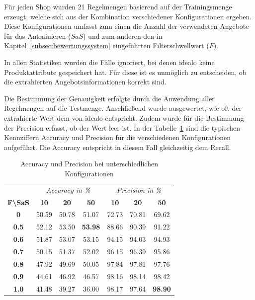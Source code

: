 Für jeden Shop wurden 21 Regelmengen basierend auf der Trainingsmenge erzeugt, welche sich aus der Kombination
verschiedener Konfigurationen ergeben.
Diese Konfigurationen umfasst zum einen die Anzahl der verwendeten Angebote für das Antrainieren ($SaS$) und zum
anderen den in Kapitel~\ref{subsec:bewertungssystem} eingeführten Filterschwellwert ($F$).

In allen Statistiken wurden die Fälle ignoriert, bei denen idealo keine Produktattribute gespeichert hat.
Für diese ist es unmöglich zu entscheiden, ob die extrahierten Angebotsinformationen korrekt sind.

Die Bestimmung der Genauigkeit erfolgte durch die Anwendung aller Regelmengen auf die Testmenge.
Anschließend wurde ausgewertet, wie oft der extrahierte Wert dem von idealo entspricht.
Zudem wurde für die Bestimmung der Precision erfasst, ob der Wert leer ist.
In der Tabelle~\ref{tab:accuracy-precision} sind die typischen Kennziffern Accuracy und Precision für die
verschiedenen Konfigurationen aufgeführt.
Die Accuracy entspricht in diesem Fall gleichzeitig dem Recall.

\begin{table}[h]
    \centering
    \begin{tabular}{ c | c c c | c c c }
        &   \multicolumn{3}{c}{\textit{Accuracy in \%}}    &   \multicolumn{3}{c}{\textit{Precision in \%}} \\
        \textbf{F\textbackslash SaS} & \textbf{10} & \textbf{20} & \textbf{50} & \textbf{10} & \textbf{20} & \textbf{50}  \\
        \hline
        \textbf{0}       &   50.59 &   50.78 &   51.07         &   72.73 &   70.81 &   69.62 \\
        \textbf{0.5}     &   52.12 &   53.50 &   \textbf{53.98}&   88.66 &   90.39 &   91.22 \\
        \textbf{0.6}     &   51.87 &   53.07 &   53.15         &   94.15 &   94.03 &   94.93 \\
        \textbf{0.7}     &   50.15 &   51.37 &   52.02         &   96.15 &   96.39 &   95.86 \\
        \textbf{0.8}     &   47.92 &   49.69 &   50.05         &   97.84 &   97.81 &   97.76 \\
        \textbf{0.9}     &   44.61 &   46.92 &   46.57         &   98.16 &   98.14 &   98.42 \\
        \textbf{1.0}     &   41.48 &   39.27 &   36.00         &   98.17 &   97.64 &   \textbf{98.90}

    \end{tabular}
    \caption{Accuracy und Precision bei unterschiedlichen Konfigurationen}
    \label{tab:accuracy-precision}
\end{table}

